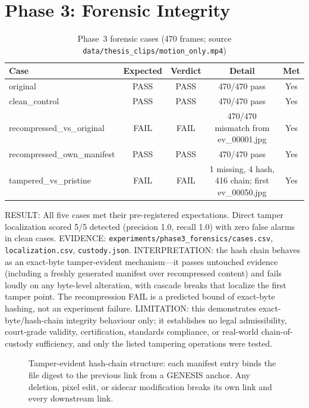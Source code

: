 \section{Phase 3: Forensic Integrity}

\begin{table}[H]
\centering
\caption{Phase~3 forensic cases (470 frames; source \texttt{data/thesis\_clips/motion\_only.mp4})}
\label{tab:phase3}
\begin{tabular}{|l|c|c|c|c|}
\hline
\textbf{Case} & \textbf{Expected} & \textbf{Verdict} & \textbf{Detail} & \textbf{Met} \\
\hline
original & PASS & PASS & 470/470 pass & Yes \\
clean\_control & PASS & PASS & 470/470 pass & Yes \\
recompressed\_vs\_original & FAIL & FAIL & 470/470 mismatch from ev\_00001.jpg & Yes \\
recompressed\_own\_manifest & PASS & PASS & 470/470 pass & Yes \\
tampered\_vs\_pristine & FAIL & FAIL & 1 missing, 4 hash, 416 chain; first ev\_00050.jpg & Yes \\
\hline
\end{tabular}
\end{table}

RESULT: All five cases met their pre-registered expectations. Direct tamper localization scored 5/5 detected (precision 1.0, recall 1.0) with zero false alarms in clean cases. EVIDENCE: \texttt{experiments/phase3\_forensics/cases.csv}, \texttt{localization.csv}, \texttt{custody.json}. INTERPRETATION: the hash chain behaves as an exact-byte tamper-evident mechanism---it passes untouched evidence (including a freshly generated manifest over recompressed content) and fails loudly on any byte-level alteration, with cascade breaks that localize the first tamper point. The recompression FAIL is a predicted bound of exact-byte hashing, not an experiment failure. LIMITATION: this demonstrates exact-byte/hash-chain integrity behaviour only; it establishes no legal admissibility, court-grade validity, certification, standards compliance, or real-world chain-of-custody sufficiency, and only the listed tampering operations were tested.

\begin{figure}[H]
\centering
{}
\caption{Tamper-evident hash-chain structure: each manifest entry binds the file digest to the previous link from a GENESIS anchor. Any deletion, pixel edit, or sidecar modification breaks its own link and every downstream link.}
\label{fig:hashchain}
\end{figure}


